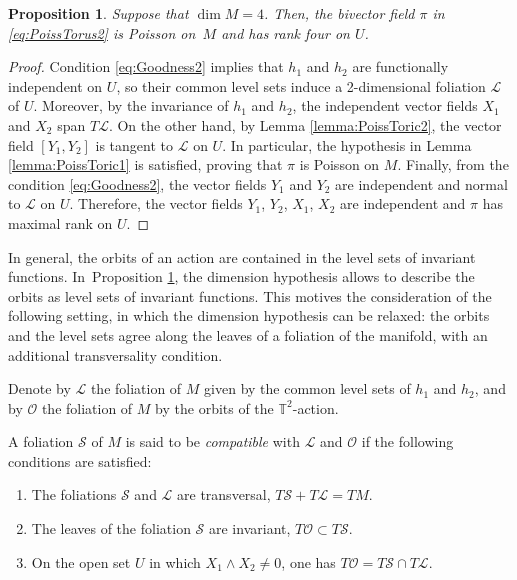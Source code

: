 \documentclass[10pt,a4paper]{amsart}
\numberwithin{equation}{section}
\newtheorem{Proposition}[Theorem]{Proposition}
 { \theoremstyle{definition}
\newtheorem{Definition}[Theorem]{Definition}
\newtheorem{Note}[Theorem]{Note}
\newtheorem{Example}[Theorem]{Example}
\newtheorem{Remark}[Theorem]{Remark} }
\begin{document}
\begin{Proposition}\label{prop:2Toric}
Suppose that $\operatorname{dim}{M} = 4$. Then, the bivector field $\pi$ in \eqref{eq:PoissTorus2} is Poisson on~$M$ and has rank four on $U$.
\end{Proposition}
\begin{proof}
Condition \eqref{eq:Goodness2} implies that $h_{1}$ and $h_{2}$ are functionally independent on $U$, so their common level sets induce a 2-dimensional foliation $\mathcal{L}$ of $U$. Moreover, by the invariance of $h_{1}$ and $h_{2}$, the independent vector fields $X_{1}$ and $X_{2}$ span $T\mathcal{L}$. On the other hand, by Lemma \ref{lemma:PoissToric2}, the vector field $[Y_1,Y_2]$ is tangent to $\mathcal{L}$ on $U$. In particular, the hypothesis in Lemma \ref{lemma:PoissToric1} is satisfied, proving that $\pi$ is Poisson on $M$. Finally, from the condition \eqref{eq:Goodness2}, the vector fields $Y_1$ and $Y_2$ are independent and normal to $\mathcal{L}$ on $U$. Therefore, the vector fields $Y_1$, $Y_2$, $X_1$, $X_2$ are independent and $\pi$ has maximal rank on $U$.
\end{proof}

In general, the orbits of an action are contained in the level sets of invariant functions. In~Pro\-position \ref{prop:2Toric}, the dimension hypothesis allows to describe the orbits as level sets of invariant functions. This motives the consideration of the following setting, in which the dimension hypothesis can be relaxed: the orbits and the level sets agree along the leaves of a foliation of the manifold, with an additional transversality condition.

Denote by $\mathcal{L}$ the foliation of $M$ given by the common level sets of $h_1$ and $h_2$, and by $\mathcal{O}$ the foliation of $M$ by the orbits of the $\mathbb{T}^2$-action.

\begin{Definition}\label{def:compat}
A foliation $\mathcal{S}$ of $M$ is said to be \emph{compatible} with $\mathcal{L}$ and $\mathcal{O}$ if the following conditions are satisfied:
 \begin{enumerate}\itemsep=0pt
 \item The foliations $\mathcal{S}$ and $\mathcal{L}$ are transversal, $T\mathcal{S} + T\mathcal{L} = TM$.
 \item The leaves of the foliation $\mathcal{S}$ are invariant, $T\mathcal{O} \subset T\mathcal{S}$.
 \item On the open set $U$ in which $X_1 \wedge X_2 \neq 0$, one has $T\mathcal{O} = T\mathcal{S} \cap T\mathcal{L}$.
 \end{enumerate}
\end{Definition}
\end{document}
